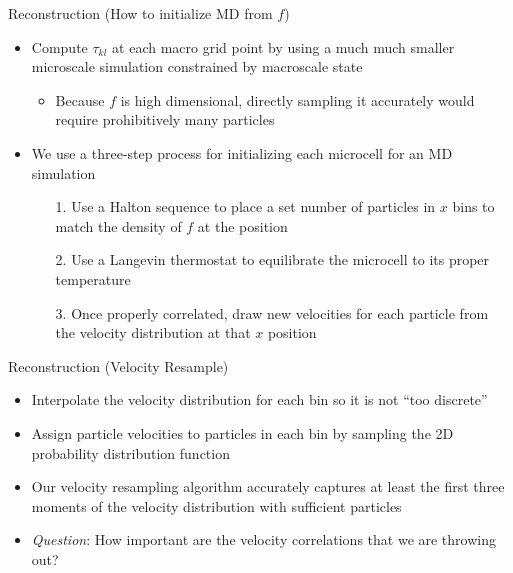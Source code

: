 \documentclass{beamer}
\begin{document}
	
	\begin{frame}{Reconstruction (How to initialize MD from $f$)}
		\begin{itemize}
		\item Compute $\tau_{kl}$ at each macro grid point by using a much much smaller microscale simulation constrained by macroscale state
		\vspace{0.5em}
		\begin{itemize}
		\item Because $f$ is high dimensional, directly sampling it accurately would require prohibitively many particles
		\end{itemize}

		\vspace{0.5em}
		\item We use a three-step process for initializing each microcell for an MD simulation
		\vspace{0.5em}
		\begin{itemize}
		\item[1. ] Use a Halton sequence to place a set number of particles in $x$ bins to match the density of $f$ at the position
		\vspace{0.5em}
		\item[2. ] Use a Langevin thermostat to equilibrate the microcell to its proper temperature
		\vspace{0.5em}
		\item[3. ] Once properly correlated, draw new velocities for each particle from the velocity distribution at that $x$ position
		\end{itemize}
		\end{itemize}
	\end{frame}
	

	
	\begin{frame}{Reconstruction (Velocity Resample)}
		\begin{itemize}
			\item Interpolate the velocity distribution for each bin so it is not ``too discrete''
			\vspace{1em}
			\item Assign particle velocities to particles in each bin by sampling the 2D probability distribution function
			\vspace{1em}
			\item Our velocity resampling algorithm accurately captures at least the first three moments of the velocity distribution with sufficient particles
			\vspace{1em}
			\item \emph{Question}: How important are the velocity correlations that we are throwing out?
		\end{itemize}
	\end{frame}
	
\end{document}
